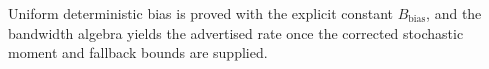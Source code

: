 Uniform deterministic bias is proved with the explicit constant \(B_{\mathrm{bias}}\), and the bandwidth algebra yields the advertised rate once the corrected stochastic moment and fallback bounds are supplied.